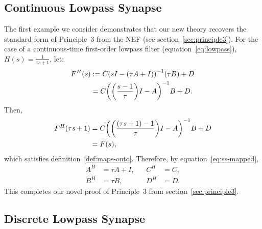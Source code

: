 \documentclass[12pt]{article}
\theoremstyle{definition}
\let\originalleft\left
\let\originalright\right
\renewcommand{\left}{\mathopen{}\mathclose\bgroup\originalleft}
\renewcommand{\right}{\aftergroup\egroup\originalright}
\begin{document}
\subsection{Continuous Lowpass Synapse}
\label{sec:principle3-proof}
\label{sec:lowpass}

The first example we consider demonstrates that our new theory recovers the standard form of Principle~3 from the NEF (see section~\ref{sec:principle3}).
For the case of a continuous-time first-order lowpass filter (equation~\ref{eq:lowpass}), $H(s) = \frac{1}{\tau s + 1}$, let:
\begin{align*}
F^H(s) &:= C \left( sI - (\tau A + I) \right)^{-1} \left( \tau B \right) + D \\
&= C \left( \left(\frac{s-1}{\tau}\right)I - A \right)^{-1}B + D \text{.}
\end{align*}
Then, 
\begin{align*}
F^H \left( \tau s + 1 \right) &= C \left( \left(\frac{(\tau s + 1) - 1}{\tau}\right) I - A \right)^{-1}B + D \\
&= F(s)\text{,} 
\end{align*}
which satisfies definition~\ref{def:maps-onto}.
Therefore, by equation~\ref{eq:ss-mapped},
\begin{equation} \label{eq:p3-novel}
\begin{aligned}
A^H &= \tau A + I \text{,} & \quad C^H &= C \text{,} \\
B^H &= \tau B \text{,} & \quad D^H &= D \text{.}
\end{aligned}
\end{equation}
This completes our novel proof of Principle~3 from section~\ref{sec:principle3}.

\subsection{Discrete Lowpass Synapse}
\label{sec:discrete-lowpass}
\end{document}
